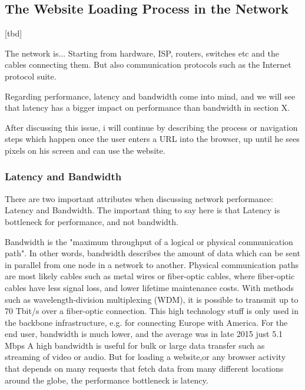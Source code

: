 \subsection{The Website Loading Process in the Network}

[tbd]

The network is... Starting from hardware, ISP, routers, switches etc and the cables connecting them.
But also communication protocols such as the Internet protocol suite.

Regarding performance, latency and bandwidth come into mind, and we will see that latency has a bigger impact on performance than bandwidth in section X.

After discussing this issue, i will continue by describing the process or navigation steps which happen once the user enters a URL into the browser, up until he sees pixels on his screen and can use the website.




\subsubsection{Latency and Bandwidth}

There are two important attributes when discussing network performance: Latency and Bandwidth.
The important thing to say here is that Latency is bottleneck for performance, and not bandwidth.



Bandwidth is the "maximum throughput of a logical or physical communication path". %
In other words, bandwidth describes the amount of data which can be sent in parallel from one node in a network to another. 
Physical communication paths are most likely cables such as metal wires or fiber-optic cables, where fiber-optic cables have less signal loss, and lower lifetime maintenance costs.
With methods such as wavelength-division multiplexing (WDM), it is possible to transmit up to 70 Tbit/s over a fiber-optic connection.  %
This high technology stuff is only used in the backbone infrastructure, e.g. for connecting Europe with America.
For the end user, bandwidth is much lower, and the average was in late 2015 just 5.1 Mbps %
A high bandwidth is useful for bulk or large data transfer such as streaming of video or audio.
But for loading a website,or any browser activity that depends on many requests that fetch data from many different locations around the globe, the performance bottleneck is latency. %


